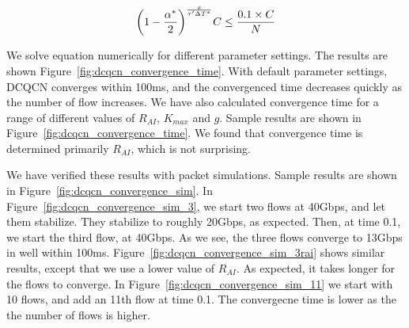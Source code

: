 \begin{equation} 
\small 
{ \left( {1 - \frac{{{\alpha ^*}}}{2}} \right)^{\frac{x}{{\tau '\Delta{T^*}}}}}C \le \frac{0.1 \times C}{N} 
\end{equation}

We solve equation numerically for different parameter settings. The results are
shown Figure~\ref{fig:dcqcn_convergence_time}. With default parameter settings,
DCQCN converges within 100ms, and the convergenced time decreases quickly as the
number of flow increases.  We have also calculated convergence time for a range
of different values of $R_{AI}$, $K_{max}$ and $g$. Sample results are shown in
Figure~\ref{fig:dcqcn_convergence_time}. We found that convergence time is
determined primarily $R_{AI}$, which is not surprising.

We have verified these results with packet simulations. Sample results are shown
in Figure~\ref{fig:dcqcn_convergence_sim}. In
Figure~\ref{fig:dcqcn_convergence_sim_3}, we start two flows at 40Gbps, and let
them stabilize. They stabilize to roughly 20Gbps, as expected. Then, at time
0.1, we start the third flow, at 40Gbps. As we see, the three flows converge to
13Gbps in well within 100ms. Figure~\ref{fig:dcqcn_convergence_sim_3rai} shows
similar results, except that we use a lower value of $R_{AI}$. As expected, it
takes longer for the flows to converge. In
Figure~\ref{fig:dcqcn_convergence_sim_11} we start with 10 flows, and add an
11th flow at time 0.1. The convergecne time is lower as the the number of flows
is higher.








